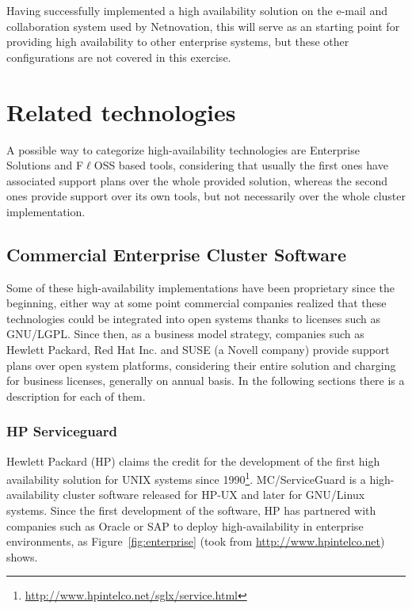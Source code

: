 \documentclass[a4paper, 12pt]{book}
\begin{document}
\noindent Having successfully implemented a high availability solution on the e-mail and collaboration system used by Netnovation, this will serve as an starting point for providing high availability to other enterprise systems, but these other configurations are not covered in this exercise.\bigskip


%
\chapter{Related technologies}
\label{chap:related}
A possible way to categorize high-availability technologies are Enterprise Solutions and F$\ell$OSS based tools, considering that usually the first ones have associated support plans over the whole provided solution, whereas the second ones provide support over its own tools, but not necessarily over the whole cluster implementation.

\section{Commercial Enterprise Cluster Software}
\label{sec:enterprise}

Some of these high-availability implementations have been proprietary since the beginning, either way at some point commercial companies realized that these technologies could be integrated into open systems thanks to licenses such as GNU/LGPL. Since then, as a business model strategy, companies such as Hewlett Packard, Red Hat Inc. and SUSE (a Novell company) provide support plans over open system platforms, considering their entire solution and charging for business licenses, generally on annual basis. In the following sections there is a description for each of them.

\subsection{HP Serviceguard}
\label{subsec:serviceguard}

Hewlett Packard (HP) claims the credit for the development of the first high availability solution for UNIX systems since 1990\footnote{\url{http://www.hpintelco.net/sglx/service.html}}. MC/ServiceGuard is a high-availability cluster software released for HP-UX and later for GNU/Linux systems. Since the first development of the software, HP has partnered with companies such as Oracle or SAP to deploy high-availability in enterprise environments, as Figure~\ref{fig:enterprise} (took from \url{http://www.hpintelco.net}) shows.\bigskip
\end{document}
